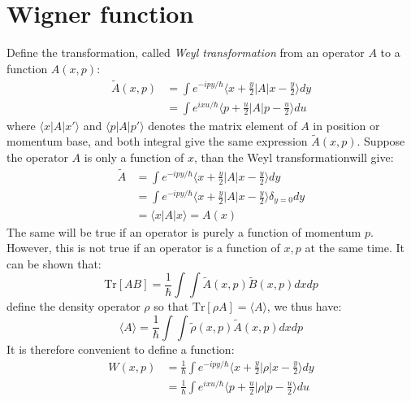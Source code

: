 \documentclass{article}
\begin{document}
\section{Wigner function}

Define the transformation, called \emph{Weyl transformation} from an operator $A$ to a function $A(x,p)$:
\begin{align}
    \tilde{A}(x,p)  &= \int e^{-ipy/\hbar} \langle x + \frac{y}{2} | A | x - \frac{y}{2} \rangle dy \\
                    &= \int e^{ ixu/\hbar} \langle p + \frac{u}{2} | A | p - \frac{u}{2} \rangle du
\end{align}
where $\langle x | A | x' \rangle$ and $\langle p | A | p' \rangle$ denotes the matrix element of $A$ 
in position or momentum base, and both integral give the same expression $\tilde{A}(x,p)$. 
Suppose the operator $A$ is only a function of $x$, than the Weyl transformationwill give:
\begin{align}
    \tilde{A} &= \int e^{-ipy/\hbar} \langle x + \frac{y}{2} | A | x - \frac{y}{2} \rangle dy \\
              &= \int e^{-ipy/\hbar} \langle x + \frac{y}{2} | A | x - \frac{y}{2} \rangle \delta_{y=0} dy \\
              &= \langle x | A | x \rangle = A(x)
\end{align}
The same will be true if an operator is purely a function of momentum $p$. However, this is not true 
if an operator is a function of $x,p$ at the same time.
It can be shown that:
\begin{equation}
    \text{Tr}[AB] = \frac{1}{\hbar} \int \int \tilde{A}(x,p) \tilde{B}(x,p) dx dp
\end{equation}
define the density operator $\rho$ so that $\text{Tr}[\rho A] = \langle A \rangle$, we thus have:
\begin{equation}
    \langle A \rangle = \frac{1}{\hbar} \int \int \tilde{\rho}(x,p) \tilde{A}(x,p) dx dp
\end{equation}
It is therefore convenient to define a function:
\begin{align}
    W(x,p)  &= \frac{1}{\hbar} \int e^{-ipy/\hbar} \langle x + \frac{y}{2} | \rho | x - \frac{y}{2} \rangle dy \\
            &= \frac{1}{\hbar} \int e^{ ixu/\hbar} \langle p + \frac{u}{2} | \rho | p - \frac{u}{2} \rangle du
\end{align}
\end{document}
